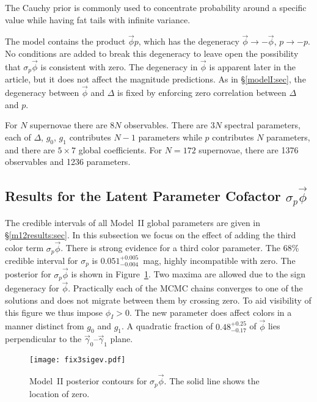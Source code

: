 \documentclass[trackchanges]{aastex62}   	%
\begin{document}
The Cauchy prior is commonly used to concentrate probability around a specific value while having fat tails with infinite variance.


The model contains the product 
$\vec{\phi} p$, which has the degeneracy $\vec{\phi} \rightarrow -\vec{\phi}$, $p \rightarrow -p$.
No conditions are added to break this degeneracy to leave open the possibility that
$\sigma_p\vec{\phi}$ is consistent with zero.  The degeneracy
in $\vec{\phi}$ is apparent later in the article, but it does not affect the magnitude predictions. 
As in \S\ref{modelI:sec}, the degeneracy between $\vec{\phi}$ and $\Delta$ is fixed by enforcing zero correlation between $\Delta$ and $p$.

For $N$ supernovae there are $8N$ observables.  There are $3N$ spectral parameters, each of
$\Delta$, $g_0$, $g_1$ contributes $N-1$ parameters while $p$  contributes $N$ parameters,  and  there are $5 \times 7$ global coefficients.
For $N=172$ supernovae, there are 1376 observables and 1236  parameters.

\subsection{Results for the Latent Parameter Cofactor $\sigma_p \vec{\phi}$}
\label{results2:sec}
The credible intervals of all Model~II global parameters are given in  \S\ref{m12results:sec}.
In this subsection we focus on the effect of adding the third color term  $\sigma_p \vec{\phi}$.
There is strong evidence for a third color parameter.
The 68\% credible interval for $\sigma_p$ is $0.051^{+0.005}_{-0.004}$~mag, highly incompatible with zero. 
The posterior for $\sigma_p \vec{\phi}$ is shown in Figure~\ref{M1ev:fig}.  
Two maxima are allowed due to the sign degeneracy for $\vec{\phi}$.  Practically each of the MCMC chains converges to one of the solutions and does
not migrate between them by crossing zero.  To aid visibility of this figure we thus impose $\phi_I > 0$.  
 The new parameter does affect colors in a  manner distinct from $g_0$ and $g_1$.
A quadratic fraction of
$0.48^{+0.25}_{-0.17}$ of 
 $\vec{\phi}$ lies perpendicular to the $\vec{\gamma}_0$--$\vec{\gamma}_1$ plane.


\begin{figure}[htbp] %
   \centering
   \texttt{[image: fix3sigev.pdf]} 
            \caption{Model~II posterior  contours for $\sigma_p \vec{\phi}$. 
            The solid line shows the location of zero.          \label{M1ev:fig}}
\end{figure}
\end{document}
